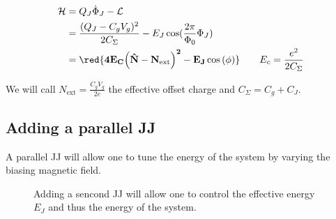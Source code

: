 \begin{enumerate}
\begin{framed}
  \begin{equation}\label{eqn:cpbox_final}
    \begin{aligned}
      \mathcal{H} & = Q_J\dot{\Phi}_J - \mathcal{L}\\
      & = \frac{(Q_J - C_gV_g)^2}{2C_\Sigma} - E_J\cos(\frac{2\pi}{\Phi_0}\Phi_J)\\
      &     =    \mathbf{\red{4E_C{\left(\hat{N}-N_\text{ext}\right)^2}-
          E_J\cos\left(\phi\right)}}\qquad E_c = \frac{e^2}{2C_\Sigma}
    \end{aligned}
  \end{equation}

  \noindent  We will  call $  N_\text{ext}  = \frac{C_g  V_g}{2e} $  the
  effective offset charge and $C_{\Sigma} = C_g+C_J$.
\end{framed}
\end{enumerate}

\subsection{Adding a parallel JJ\label{subsec:cpb_2}}
\begin{framed}\noindent
  A parallel  JJ will  allow one  to tune  the energy  of the  system by
  varying the biasing magnetic field.
\end{framed}

\begin{figure}[h]
  \centering {}
  \caption{\small  Adding a  sencond JJ  will allow  one to  control the
    effective   energy   $E_{J}$   and    thus   the   energy   of   the
    system.\label{fig:cooper_pair_box_3_tuneable}}
\end{figure}

